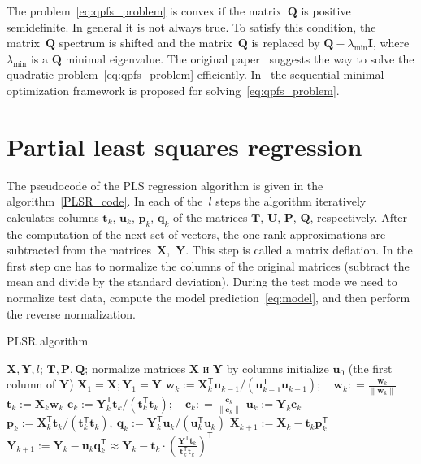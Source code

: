\documentclass[12pt,oneside]{article}
\theoremstyle{definition}
\newcommand{\bw}{\mathbf{w}}
\newcommand{\bY}{\mathbf{Y}}
\newcommand{\bX}{\mathbf{X}}
\newcommand{\bu}{\mathbf{u}}
\newcommand{\bt}{\mathbf{t}}
\newcommand{\bp}{\mathbf{p}}
\newcommand{\bq}{\mathbf{q}}
\newcommand{\bc}{\mathbf{c}}
\newcommand{\bP}{\mathbf{P}}
\newcommand{\bT}{\mathbf{T}}
\newcommand{\bQ}{\mathbf{Q}}
\newcommand{\bU}{\mathbf{U}}
\newcommand{\T}{\mathsf{T}}
\begin{document}
The problem~\eqref{eq:qpfs_problem} is convex if the matrix~$\bQ$ is positive semidefinite. In general it is not always true.
To satisfy this condition, the matrix~$\bQ$ spectrum is shifted and the matrix~$\bQ$ is replaced by $\bQ - \lambda_{\text{min}} \mathbf{I}$, where $\lambda_{\text{min}} $ is a $\bQ$ minimal eigenvalue.
The original paper~\cite{rodriguez2010quadratic} suggests the way to solve the quadratic problem~\eqref{eq:qpfs_problem} efficiently. In~\cite{prasad2013scaling} the sequential minimal optimization framework is proposed for solving~\eqref{eq:qpfs_problem}.

\section{Partial least squares regression}
\label{sec:pls}

The pseudocode of the PLS regression algorithm is given in the algorithm~\ref{PLSR_code}.
In each of the~$l$ steps the algorithm iteratively calculates columns $\bt_k$, $\bu_k$, $\bp_k$, $\bq_k$ of the matrices $\bT$, $\bU$, $\bP$, $\bQ$, respectively. 
After the computation of the next set of vectors, the one-rank approximations are subtracted from the matrices~$\bX$,~$\bY$. 
This step is called a matrix deflation.
In the first step one has to normalize the columns of the original matrices (subtract the mean and divide by the standard deviation).
During the test mode we need to normalize test data, compute the model prediction~\eqref{eq:model}, and then perform the reverse normalization.

\begin{algorithm}[h]
	\caption{PLSR algorithm}
	\label{PLSR_code}
	\begin{algorithmic}[1]
		\REQUIRE $\bX, \bY, l$;
		\ENSURE $\bT, \bP, \bQ$;
		\STATE normalize matrices $\bX$ и $\bY$ by columns
		\STATE initialize $\bu_0$ (the first column of $\bY$)
		\STATE $\bX_1 = \bX; \bY_1 = \bY$
		\REPEAT
		\vspace{0.1cm}
		\STATE $\bw_k := \bX_k^{\T} \bu_{k-1} / (\bu_{k-1}^{\T} \bu_{k-1}); \quad \bw_k: = \frac{\bw_k}{\| \bw_k \|}$
		\vspace{0.1cm}
		\STATE $\bt_k := \bX_k \bw_k$
		\vspace{0.1cm}
		\STATE $\bc_k := \bY_k^{\T} \bt_k / (\bt_k^{\T} \bt_k); \quad \bc_k: = \frac{\bc_k}{\| \bc_k \|}$
		\vspace{0.1cm}
		\STATE $\bu_k := \bY_k \bc_k$
		\UNTIL{$\bt_k$ stabilizes}
		\vspace{0.1cm}
		\STATE $\bp_k:= \bX_k^{\T}\bt_k/(\bt_k^{\T}\bt_k),\ 
		\bq_k := \bY_k^{\T}\bu_k/(\bu_k^{\T}\bu_k)$
		\vspace{0.2cm}
		\STATE $\bX_{k+1} :=  \bX_k - \bt_k \bp_k^{\T}$
		\vspace{0.2cm}
		\STATE $\bY_{k + 1} :=  \bY_k - \bu_k \bq_k^{\T} \approx  \bY_k - \bt_k \cdot \left(\frac{\bY^{\T}\bt_k}{\bt_k^{\T}\bt_k}\right)^{\T} $ 
		\ENDFOR
	\end{algorithmic}
\end{algorithm}
\end{document}
